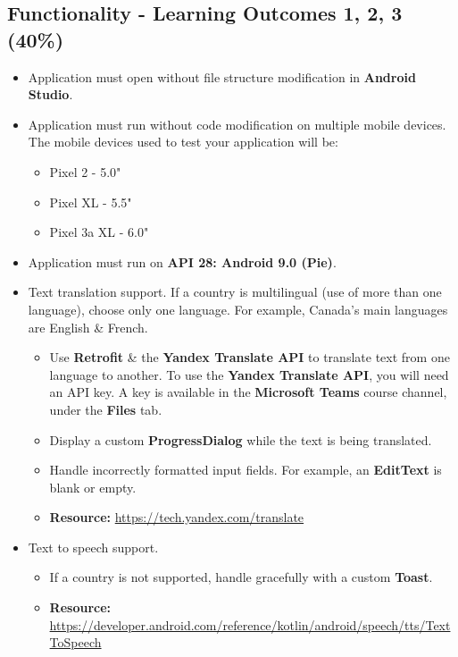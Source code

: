 \documentclass{article}
\begin{document}
\subsection*{Functionality - Learning Outcomes 1, 2, 3 (40\%)}
\begin{itemize}
	\item Application must open without file structure modification in \textbf{Android Studio}.
	\item Application must run without code modification on multiple mobile devices. The mobile devices used to test your application will be:
	      \begin{itemize}
		      \item Pixel 2 - 5.0"
		      \item Pixel XL - 5.5"
		      \item Pixel 3a XL - 6.0"
	      \end{itemize}
	\item Application must run on \textbf{API 28: Android 9.0 (Pie)}.
	\item Text translation support. If a country is multilingual (use of more than one language), choose only one language. For example, Canada's main languages are English \& French.
	      \begin{itemize}
		      \item Use \textbf{Retrofit} \& the \textbf{Yandex Translate API} to translate text from one language to another. To use the \textbf{Yandex Translate API}, you will need an API key. A key is available in the \textbf{Microsoft Teams} course channel, under the \textbf{Files} tab.
		      \item Display a custom \textbf{ProgressDialog} while the text is being translated.
		      \item Handle incorrectly formatted input fields. For example, an \textbf{EditText} is blank or empty.
		      \item \textbf{Resource:} \footnotesize\href{https://tech.yandex.com/translate}{https://tech.yandex.com/translate}
	      \end{itemize}
	\item Text to speech support.
	      \begin{itemize}
		      \item If a country is not supported, handle gracefully with a custom \textbf{Toast}.
		      \item \textbf{Resource:} \footnotesize\href{https://developer.android.com/reference/kotlin/android/speech/tts/TextToSpeech}{https://developer.android.com/reference/kotlin/android/speech/tts/TextToSpeech}

\end{itemize}
\end{itemize}
\end{document}
